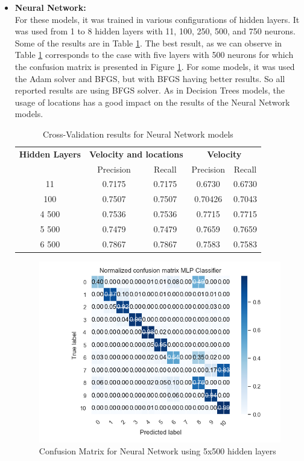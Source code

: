 \begin{itemize}
\newpage
\item \textbf{Neural Network: }\\
For these models, it was trained in various configurations of hidden layers. It was used from 1 to 8 hidden layers with 11, 100, 250, 500, and 750 neurons. Some of the results are in Table \ref{table:cross_val_nn}. The best result, as we can observe in Table \ref{table:cross_val_nn} corresponds to the case with five layers with 500 neurons for which the confusion matrix is presented in Figure \ref{fig:cm_nn}.
For some models, it was used the Adam solver and BFGS, but with BFGS having better results. So all reported results are using BFGS solver.
As in Decision Trees models, the usage of locations has a good impact on the results of the Neural Network models.


\begin {table}[H]
\caption {Cross-Validation results for Neural Network models}
\begin{center}
\begin{tabular}{c|c|c|c|c}
\multicolumn{1}{c|}{\textbf{Hidden Layers } } &\multicolumn{2}{c|}{\textbf{ Velocity and locations}}& \multicolumn{2}{c}{\textbf{ Velocity}}\\
&Precision & Recall & Precision & Recall \\
\hline
11 &0.7175&0.7175&0.6730 &0.6730\\
100 &0.7507&0.7507&0.70426 &0.7043\\
4 500 &0.7536&0.7536&0.7715& 0.7715\\
5 500 &0.7479&0.7479&0.7659& 0.7659\\
6 500 &0.7867&0.7867&0.7583&0.7583
\label{table:cross_val_nn}
\end{tabular}
\end{center}
\end {table}


\begin{figure}[h]
\centering
\includegraphics[width=0.8\linewidth]{Chapters/img/CM_NN.png}
\caption{Confusion Matrix for Neural Network using 5x500 hidden layers}
\label{fig:cm_nn}
\end{figure}



\end{itemize}
